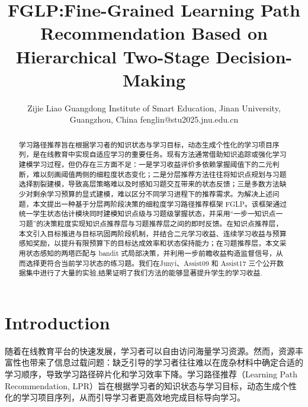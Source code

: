 \documentclass[11pt,a4paper]{article}
\title{FGLP:Fine-Grained Learning Path Recommendation Based on Hierarchical Two-Stage Decision-Making}
\author{%
    Zijie Liao
    \affiliations
    Guangdong Institute of Smart Education, Jinan University, Guangzhou, China
    \emails
    fenglin@stu2025.jnu.edu.cn
}
\begin{document}
\maketitle

\begin{abstract}
 学习路径推荐旨在根据学习者的知识状态与学习目标，动态生成个性化的学习项目序列，是在线教育中实现自适应学习的重要任务。现有方法通常借助知识追踪或强化学习建模学习过程，但仍存在三方面不足：一是学习收益评价多依赖掌握阈值下的二元判断，难以刻画阈值两侧的细粒度状态变化；二是分层推荐方法往往将知识点规划与习题选择割裂建模，导致高层策略难以及时感知习题交互带来的状态反馈；三是多数方法缺少对剩余学习预算的显式建模，难以区分不同学习进程下的推荐需求。为解决上述问题，本文提出一种基于分层两阶段决策的细粒度学习路径推荐框架 FGLP。该框架通过统一学生状态估计模块同时建模知识点级与习题级掌握状态，并采用“一步一知识点一习题”的决策粒度实现知识点推荐层与习题推荐层之间的即时反馈。在知识点推荐层，本文引入目标推进与目标巩固两阶段机制，并结合二元学习收益、连续学习收益与预算感知奖励，以提升有限预算下的目标达成效率和状态保持能力；在习题推荐层，本文采用状态感知的两塔匹配与 bandit 式局部决策，并利用一步前瞻收益构造监督信号，从而选择更符合当前学习状态的练习题。我们在Junyi、Assist09 和 Assist17 三个公开数据集中进行了大量的实验,结果证明了我们方法的能够显著提升学生的学习收益.   
\end{abstract}

\section{Introduction}
随着在线教育平台的快速发展，学习者可以自由访问海量学习资源\cite{korableva2019studying,zhang2019hierarchical}。然而，资源丰富性也带来了信息过载问题：缺乏引导的学习者往往难以在庞杂材料中确定合适的学习顺序，导致学习路径碎片化和学习效率下降。学习路径推荐（Learning Path Recommendation, LPR）旨在根据学习者的知识状态与学习目标，动态生成个性化的学习项目序列，从而引导学习者更高效地完成目标导向学习\cite{nabizadeh2020learning,guan2025explainable,liu2019exploiting}。
\end{document}
